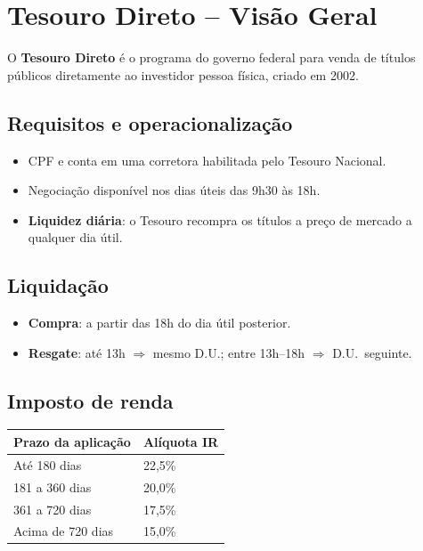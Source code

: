 \section{Tesouro Direto -- Visão Geral}

O \textbf{Tesouro Direto} é o programa do governo federal para venda de títulos públicos
diretamente ao investidor pessoa física, criado em 2002.

\subsection{Requisitos e operacionalização}

\begin{itemize}
  \item CPF e conta em uma corretora habilitada pelo Tesouro Nacional.
  \item Negociação disponível nos dias úteis das 9h30 às 18h.
  \item \textbf{Liquidez diária}: o Tesouro recompra os títulos a preço de mercado a qualquer dia útil.
\end{itemize}

\subsection{Liquidação}

\begin{itemize}
  \item \textbf{Compra}: a partir das 18h do dia útil posterior.
  \item \textbf{Resgate}: até 13h $\Rightarrow$ mesmo D.U.; entre 13h--18h $\Rightarrow$ D.U.\ seguinte.
\end{itemize}

\subsection{Imposto de renda}

\begin{center}
\renewcommand{\arraystretch}{1.3}
\begin{tabular}{ll}
\toprule
\textbf{Prazo da aplicação} & \textbf{Alíquota IR} \\
\midrule
Até 180 dias        & 22,5\% \\
181 a 360 dias      & 20,0\% \\
361 a 720 dias      & 17,5\% \\
Acima de 720 dias   & 15,0\% \\
\bottomrule
\end{tabular}
\end{center}


